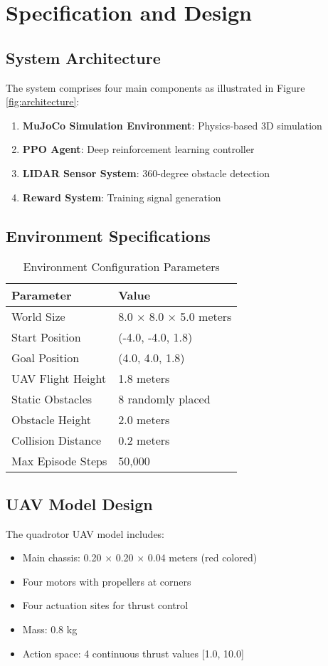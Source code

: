 \documentclass[12pt,a4paper]{article}
\begin{document}
\section{Specification and Design}

\subsection{System Architecture}
The system comprises four main components as illustrated in Figure \ref{fig:architecture}:

\begin{enumerate}
    \item \textbf{MuJoCo Simulation Environment}: Physics-based 3D simulation
    \item \textbf{PPO Agent}: Deep reinforcement learning controller
    \item \textbf{LIDAR Sensor System}: 360-degree obstacle detection
    \item \textbf{Reward System}: Training signal generation
\end{enumerate}

\subsection{Environment Specifications}
\begin{table}[H]
\centering
\caption{Environment Configuration Parameters}
\begin{tabular}{@{}ll@{}}
\toprule
Parameter & Value \\
\midrule
World Size & 8.0 × 8.0 × 5.0 meters \\
Start Position & (-4.0, -4.0, 1.8) \\
Goal Position & (4.0, 4.0, 1.8) \\
UAV Flight Height & 1.8 meters \\
Static Obstacles & 8 randomly placed \\
Obstacle Height & 2.0 meters \\
Collision Distance & 0.2 meters \\
Max Episode Steps & 50,000 \\
\bottomrule
\end{tabular}
\end{table}

\subsection{UAV Model Design}
The quadrotor UAV model includes:
\begin{itemize}
    \item Main chassis: 0.20 × 0.20 × 0.04 meters (red colored)
    \item Four motors with propellers at corners
    \item Four actuation sites for thrust control
    \item Mass: 0.8 kg
    \item Action space: 4 continuous thrust values [1.0, 10.0]
\end{itemize}
\end{document}
